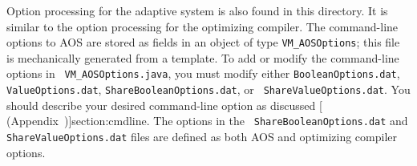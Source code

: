 Option processing for the adaptive system is also found in this
directory.  It is similar to the option processing for the optimizing
compiler.  The command-line options to AOS are
stored as fields in an object of type {\tt VM\_AOSOptions}; this file
is mechanically generated from a template.
To add or modify the command-line options in {\tt
VM\_AOSOptions.java}, you must modify either {\tt BooleanOptions.dat},
{\tt ValueOptions.dat}, {\tt ShareBooleanOptions.dat}, or {\tt
ShareValueOptions.dat}.  You should describe your desired command-line
option as discussed [ (Appendix~\Ref)]{section:cmdline}.  The options in the {\tt
ShareBooleanOptions.dat} and {\tt ShareValueOptions.dat} files are
defined as both AOS and optimizing compiler options.


